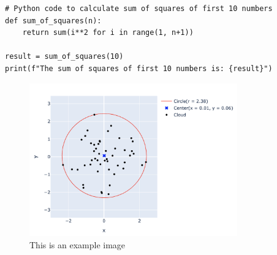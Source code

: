 \documentclass{article}  %
\begin{document}
\begin{lstlisting}
# Python code to calculate sum of squares of first 10 numbers
def sum_of_squares(n):
    return sum(i**2 for i in range(1, n+1))

result = sum_of_squares(10)
print(f"The sum of squares of first 10 numbers is: {result}")
\end{lstlisting}

\begin{figure}[h]
    \centering                                          %
    \includegraphics[width=0.8\textwidth]{graph.png}    %
    \caption{This is an example image}                  %
    \label{fig:example}                                 %
\end{figure}

\end{document}
